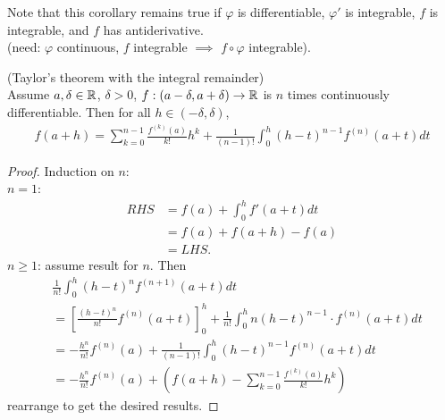 \documentclass[a4paper]{article}
\begin{document}
Note that this corollary remains true if $\varphi$ is differentiable, $\varphi'$ is integrable, $f$ is integrable, and $f$ has antiderivative.\\
(need: $\varphi$ continuous, $f$ integrable $\implies$ $f\circ\varphi$ integrable).

\begin{thm} (Taylor's theorem with the integral remainder)\\
Assume $a,\delta \in \mathbb{R}$, $\delta>0$, $f:\left(a-\delta, a+\delta\right) \to \mathbb{R}$ is $n$ times continuously differentiable. Then for all $h\in\left(-\delta,\delta\right)$,
\begin{equation*}
\begin{aligned}
f\left(a+h\right)=\sum_{k=0}^{n-1} \frac{f^{\left(k\right)} \left(a\right)}{k!} h^k + \frac{1}{\left(n-1\right)!}\int_0^h \left(h-t\right)^{n-1} f^{\left(n\right)} \left(a+t\right) dt
\end{aligned}
\end{equation*}
\begin{proof}
Induction on $n$:\\
$n=1$:
\begin{equation*}
\begin{aligned}
RHS &= f\left(a\right) + \int_0^h f'\left(a+t\right) dt\\
&= f\left(a\right) + f\left(a+h\right) - f\left(a\right)\\
&= LHS.
\end{aligned}
\end{equation*}
$n\geq 1$: assume result for $n$. Then
\begin{equation*}
\begin{aligned}
&\frac{1}{n!}\int_0^h \left(h-t\right)^n f^{\left(n+1\right)} \left(a+t\right) dt\\
&= \left[\frac{\left(h-t\right)^n}{n!}f^{\left(n\right)} \left(a+t\right)\right]_0^h + \frac{1}{n!} \int_0^h n\left(h-t\right)^{n-1} \cdot f^{\left(n\right)} \left(a+t\right) dt\\
&= -\frac{h^n}{n!} f^{\left(n\right)} \left(a\right) + \frac{1}{\left(n-1\right)!} \int_0^h \left(h-t\right)^{n-1} f^{\left(n\right)} \left(a+t\right)dt\\
&=-\frac{h^n}{n!} f^{\left(n\right)} \left(a\right) + \left(f\left(a+h\right) - \sum_{k=0}^{n-1} \frac{f^{\left(k\right)} \left(a\right)}{k!} h^k\right)
\end{aligned}
\end{equation*}
rearrange to get the desired results.
\end{proof}
\end{thm}
\end{document}
